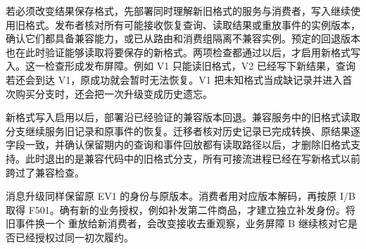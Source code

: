 若必须改变结果保存格式，先部署同时理解新旧格式的服务与消费者，写入继续使用旧格式。发布者核对所有可能接收恢复查询、读取结果或重放事件的实例版本，确认它们都具备兼容能力，或已从路由和消费组隔离不兼容实例。预定的回退版本也在此时验证能够读取将要保存的新格式。两项检查都通过以后，才启用新格式写入。这一检查形成发布屏障。例如 V1 只能读旧格式，V2 已经写下新结果，查询若还会到达 V1，原成功就会暂时无法恢复。V1 把未知格式当成缺记录并进入首次购买分支时，还会把一次升级变成历史遗忘。

新格式写入启用以后，部署沿已经验证的兼容版本回退。兼容服务中的旧格式读取分支继续服务旧记录和原事件的恢复。迁移者核对历史记录已完成转换、原结果逐字段一致，并确认保留期内的查询和事件回放都有读取路径以后，才删除旧格式支持。此时退出的是兼容代码中的旧格式分支，所有可接流进程已经在写新格式以前跨过了兼容检查。


消息升级同样保留原 EV1 的身份与原版本。消费者用对应版本解码，再按原 I/B 取得 F501。确有新的业务授权，例如补发第二件商品，才建立独立补发身份。将旧事件换一个  重放给新消费者，会改变接收去重观察，业务屏障 B 继续核对它是否已经授权过同一初次履约。
\FloatBarrier
